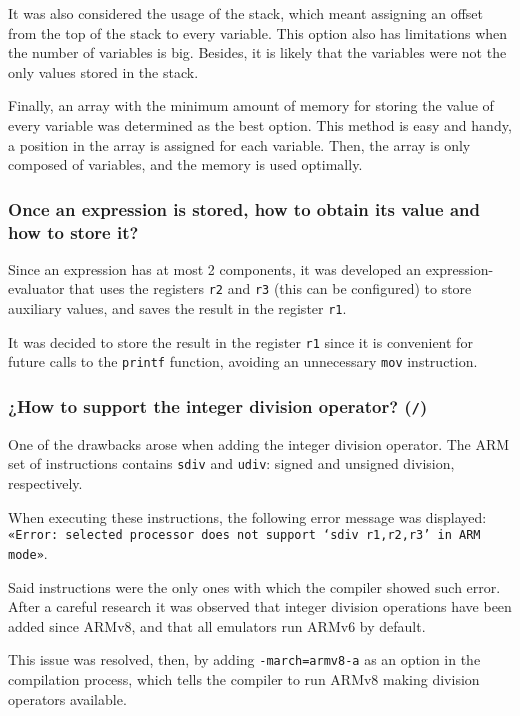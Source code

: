 \documentclass[12pt,spanish]{article}
\begin{document}
It was also considered the usage of the stack, which meant assigning an offset from the top of the stack to every variable. This option also has limitations when the number of variables is big. Besides, it is likely that the variables were not the only values stored in the stack.

Finally, an array with the minimum amount of memory for storing the value of every variable was determined as the best option. This method is easy and handy, a position in the array is assigned for each variable. Then, the array is only composed of variables, and the memory is used optimally.

\subsubsection{Once an expression is stored, how to obtain its value and how to store it?}

Since an expression has at most 2 components, it was developed an expression-evaluator that uses the registers \texttt{r2} and \texttt{r3} (this can be configured) to store auxiliary values, and saves the result in the register \texttt{r1}.

It was decided to store the result in the register \texttt{r1} since it is convenient for future calls to the \texttt{printf} function, avoiding an unnecessary \texttt{mov} instruction.

\subsubsection{¿How to support the integer division operator? (\texttt{/})}

One of the drawbacks arose when adding the integer division operator. The ARM set of instructions contains \texttt{sdiv} and \texttt{udiv}: signed and unsigned division, respectively.

When executing these instructions, the following error message was displayed: \texttt{«Error: selected processor does not support `sdiv r1,r2,r3' in ARM mode»}.

Said instructions were the only ones with which the compiler showed such error. After a careful research it was observed that integer division operations have been added since ARMv8, and that all emulators run ARMv6 by default.

This issue was resolved, then, by adding \texttt{-march=armv8-a} as an option in the compilation process, which tells the compiler to run ARMv8 making division operators available.
\end{document}
